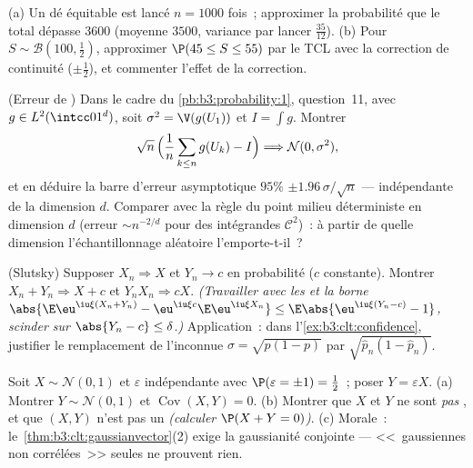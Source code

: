 \begin{exercise}[$\star\star$]\label{exo:b3:clt:6}
(a) Un dé équitable est lancé $n = 1000$ fois~; approximer
la probabilité que le total dépasse $3600$ (moyenne $3500$,
variance par lancer $\frac{35}{12}$).
(b) Pour $S \sim \mathcal B(100, \frac12)$, approximer
$\P(45 \leq S \leq 55)$ par le TCL avec la correction de
continuité ($\pm\frac12$), et commenter l'effet de la
correction.
\end{exercise}

\begin{exercise}[$\star\star$]\label{exo:b3:clt:7}
(Erreur de ) Dans le cadre du
\cref{pb:b3:probability:1}, question~11, avec $g \in
L^2(\intcc01^d)$, soit $\sigma^2 = \V(g(U_1))$ et $I =
\int g$. Montrer
\[
\sqrt n\,\Bigl(\frac1n\sum_{k\leq n}g(U_k) - I\Bigr)
\Longrightarrow \mathcal N(0, \sigma^2),
\]
et en déduire la barre d'erreur asymptotique $95\%$ $\pm
1.96\,\sigma/\sqrt n$ --- indépendante de la dimension $d$.
Comparer avec la règle du point milieu déterministe en
dimension $d$ (erreur $\sim n^{-2/d}$ pour des intégrandes
$\mathcal C^2$)~: à partir de quelle dimension
l'échantillonnage aléatoire l'emporte-t-il~?
\end{exercise}

\begin{exercise}[$\star\star\star$]\label{exo:b3:clt:8}
(Slutsky) Supposer $X_n \Rightarrow X$ et $Y_n \to c$ en
probabilité ($c$ constante). Montrer $X_n + Y_n \Rightarrow
X + c$ et $Y_nX_n \Rightarrow cX$. \emph{(Travailler avec
les  et la borne
$\abs{\E\eu^{\iu\xi(X_n+Y_n)} - \eu^{\iu\xi
c}\E\eu^{\iu\xi X_n}} \leq \E\abs{\eu^{\iu\xi(Y_n - c)} -
1}$, scinder sur $\abs{Y_n - c} \leq \delta$.)}
Application~: dans l'\cref{ex:b3:clt:confidence}, justifier
le remplacement de l'inconnue $\sigma = \sqrt{p(1-p)}$ par
$\sqrt{\hat p_n(1 - \hat p_n)}$.
\end{exercise}

\begin{exercise}[$\star\star\star$]\label{exo:b3:clt:9}
Soit $X \sim \mathcal N(0,1)$ et $\varepsilon$ indépendante
avec $\P(\varepsilon = \pm1) = \frac12$~; poser $Y =
\varepsilon X$.
(a) Montrer $Y \sim \mathcal N(0,1)$ et
$\operatorname{Cov}(X, Y) = 0$.
(b) Montrer que $X$ et $Y$ ne sont \emph{pas}
, et que $(X, Y)$ n'est pas un  \emph{(calculer $\P(X + Y = 0)$)}.
(c) Morale~: le~\cref{thm:b3:clt:gaussianvector}(2) exige
la gaussianité conjointe --- <<~gaussiennes non corrélées~>>
seules ne prouvent rien.
\end{exercise}

